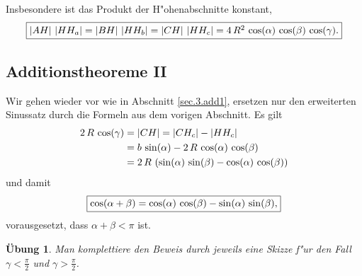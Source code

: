 \documentclass[11pt,a4paper]{article}
\newtheorem{uebung}{\"{U}bung}
\begin{document}
Insbesondere ist das Produkt der H"ohenabschnitte konstant,
\[
\framebox{$
\msegment{AH}\,\msegment{HH_a} =\msegment{BH}\,\msegment{HH_b}
=\msegment{CH}\,\msegment{HH_c}
=4\,R^2\,\cos(\alpha)\,\cos(\beta)\,\cos(\gamma).$} \] 

\subsection{Additionstheoreme II}
\label{sec.3.5}
Wir gehen wieder vor wie in Abschnitt \ref{sec.3.add1}, ersetzen nur den
erweiterten Sinussatz durch die Formeln aus dem vorigen Abschnitt. Es gilt
\begin{align*}
2\,R\,\cos(\gamma)&=\left\vert {\mathnormal{CH}}\right\vert=\left\vert {\mathnormal{CH_c}}\right\vert-\left\vert {\mathnormal{HH_c}}\right\vert\\
&=b\,\sin(\alpha)-2\,R\,\cos(\alpha)\,\cos(\beta)\\
&=2\,R\,\left(\sin(\alpha)\,\sin(\beta)-\cos(\alpha)\,\cos(\beta)\right)
\end{align*}
und damit 
\[\framebox{$\cos(\alpha+\beta)
  =\cos(\alpha)\,\cos(\beta)-\sin(\alpha)\,\sin(\beta)$,}\] 
vorausgesetzt, dass $\alpha+\beta<\pi$ ist. 

\begin{uebung}
  Man komplettiere den Beweis durch jeweils eine Skizze f"ur den Fall
  $\gamma<\frac\pi2$ und $\gamma>\frac\pi2$.
\end{uebung}
\end{document}
